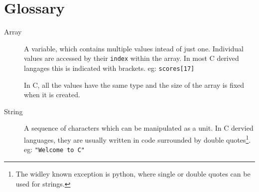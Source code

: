 
\chapter*{Glossary}

\begin{description}
 \item[\hypertarget{defn:array}{Array}] A variable, which contains multiple values intead of just one. 
 Individual values are accessed by their \texttt{index} within the array.
 In most C derived langages this is indicated with brackets.
 eg:
    \lstinline!scores[17]!
    
 In C, all the values have the same type and the size of the array is fixed 
 when it is created.
 
 \item[\hypertarget{defn:string}{String}] A sequence of characters which can be manipulated as a unit.
 In C dervied languages, they are usually written in code surrounded by double quotes\footnote{The widley known exception 
 is python, where single or double quotes can be used for strings.}.
 eg:
 \lstinline!"Welcome to C"!
\end{description}
